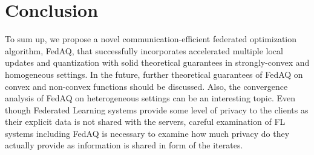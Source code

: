 \section{Conclusion}
\label{discussion}

To sum up, we propose a novel communication-efficient federated optimization algorithm, FedAQ, that successfully incorporates accelerated multiple local updates and quantization with solid theoretical guarantees in strongly-convex and homogeneous settings. In the future, further theoretical guarantees of FedAQ on convex and non-convex functions should be discussed. Also, the convergence analysis of FedAQ on heterogeneous settings can be an interesting topic. Even though Federated Learning systems provide some level of privacy to the clients as their explicit data is not shared with the servers, careful examination of FL systems including FedAQ is necessary to examine how much privacy do they actually provide as information is shared in form of the iterates.